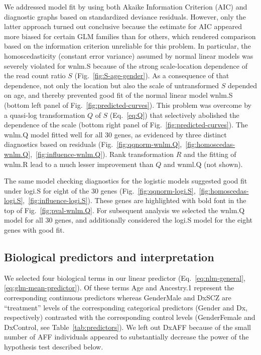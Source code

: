 \documentclass[letterpaper]{article}
\begin{document}
We addressed model fit by using both Akaike Information Criterion (AIC) and
diagnostic graphs based on standardized deviance residuals.  However, only the
latter approach turned out conclusive because the estimate for AIC appeared
more biased for certain GLM families than for others, which rendered
comparison based on the information criterion unreliable for this problem.  In
particular, the homoscedasticity (constant error variance) assumed by normal
linear models was severely violated for wnlm.S because of the strong
scale-location dependence of the read count ratio \(S\)
(Fig.~\ref{fig:S-age-gender}).  As a consequence of that dependence, not only
the location but also the scale of untransformed \(S\) depended on age, and
thereby prevented good fit of the normal linear model wnlm.S (bottom left
panel of Fig.~\ref{fig:predicted-curves}).  This problem was overcome by a
quasi-log transformation \(Q\) of \(S\) (Eq.~\ref{eq:Q}) that selectively abolished
the dependence of the scale (bottom right panel of
Fig.~\ref{fig:predicted-curves}).  The wnlm.Q model fitted well for all 30
genes, as evidenced by three distinct
diagnostics based on residuals
(Fig.~\ref{fig:qqnorm-wnlm.Q},~\ref{fig:homoscedas-wnlm.Q},~\ref{fig:influence-wnlm.Q}).
Rank transformation \(R\) and the fitting of wnlm.R lead to a much lesser
improvement than \(Q\) and wnml.Q (not shown).

The same model checking diagnostics for the logistic models suggested good
fit under logi.S for eight of the 30 genes
(Fig.~\ref{fig:qqnorm-logi.S},~\ref{fig:homoscedas-logi.S},~\ref{fig:influence-logi.S}).
These genes are highlighted with bold font in the top of Fig.~\ref{fig:pval-wnlm.Q}.
For subsequent analysis we selected  the wnlm.Q model for all 30 genes, and
additionally considered the logi.S model for the eight
genes with good fit.

\subsection{Biological predictors and interpretation}

We selected four biological terms in our linear predictor
(Eq.~\ref{eq:nlm-general}, \ref{eq:glm-mean-predictor}).  Of these terms Age
and Ancestry.1 represent the corresponding continuous predictors whereas
GenderMale and DxSCZ are “treatment” levels of the corresponding categorical
predictors (Gender and Dx, respectively) contrasted with the corresponding
control levels (GenderFemale and DxControl, see Table~\ref{tab:predictors}).
We left out DxAFF because of the small number of AFF individuals appeared to
substantially decrease the power of the hypothesis test described below.
\end{document}
